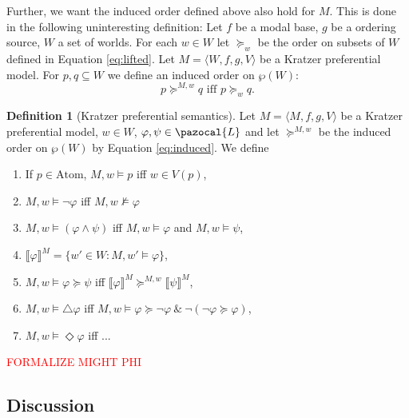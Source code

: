 \documentclass{article}
\theoremstyle{definition}
\newtheorem{definition}{Definition}
\newcommand\todo[1]{\textcolor{red}{#1}}
\renewcommand{\L}{\pazocal{L}}
\newcommand{\lb}{\llbracket}
\newcommand{\rb}{\rrbracket}
\begin{document}
Further, we want the induced order defined above also hold for $M$.
This is done in the following uninteresting definition:
Let $f$ be a modal base, $g$ be a ordering source, $W$ a set of worlds.
For each $w \in W$ let $\succeq_w$ be the order on subsets of $W$ defined in
Equation \ref{eq:lifted}.
Let $M = \langle W,f,g,V \rangle$ be a Kratzer preferential model.
For $p,q \subseteq W$ we define an induced order on $\wp(W)$:   
\begin{equation}
    \label{eq:induced}
       p \succeq^{M,w} q \text{ iff } p \succeq_w q.
\end{equation}
    
\begin{definition}[Kratzer preferential semantics]
    \label{def:kratsem}
    Let $M = \langle M,f,g,V \rangle$ be a Kratzer preferential model, $w \in W$, $\varphi, \psi \in \L$ and let $\succeq^{M,w}$ be the induced order on $\wp(W)$ by Equation \ref{eq:induced}. We define 
    
    \begin{enumerate}[nosep]
      \item If $p \in \text{Atom}$, $M,w \models p$ iff $w \in V(p)$,
      \item $M,w \models \neg \varphi$ iff $M,w \not\models \varphi$
      \item $M,w \models (\varphi \land \psi)$ iff $M,w \models \varphi$ and $M,w \models \psi$,
      \item $\lb \varphi \rb^M = \{w' \in W : M,w' \models \varphi\}$,
      \item $M,w \models \varphi \succeq \psi$ iff $\lb \varphi \rb^M \succeq^{M,w} \lb \psi \rb^M$,
      \item $M,w \models \triangle \varphi$ iff $M,w \models \varphi \succeq \neg \varphi ~\&~ \neg (\neg \varphi \succeq \varphi)$,
      \item $M,w \models \Diamond \varphi$ iff ...
    \end{enumerate}
\end{definition}

\todo{FORMALIZE MIGHT PHI}
\subsection{Discussion}
\end{document}
